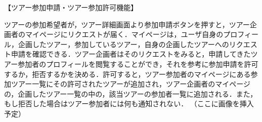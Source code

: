 【ツアー参加申請・ツアー参加許可機能】
\par
ツアーの参加希望者が，ツアー詳細画面より参加申請ボタンを押すと，ツアー企画者のマイページにリクエストが届く．マイページは，ユーザ自身のプロフィール，企画したツアー，参加しているツアー，自身の企画したツアーへのリクエスト申請を確認できる．ツアー企画者はそのリクエストをみると，申請してきたツアー参加者のプロフィールを閲覧することができ，それを参考に参加申請を許可するか，拒否するかを決める．許可すると，ツアー参加者のマイページにある参加ツアー一覧にその許可されたツアーが追加され，ツアー企画者のマイページの，企画したツアー一覧の中の，該当ツアーの参加者一覧に追加される．また，もし拒否した場合はツアー参加者には何も通知されない．
（ここに画像を挿入予定）
